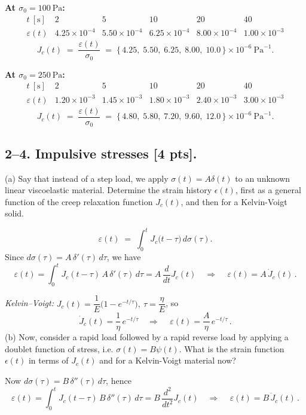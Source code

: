 \noindent\textbf{At $\sigma_0=100~\mathrm{Pa}$:}
$$
\begin{array}{c|ccccc}
t~[\mathrm{s}] & 2 & 5 & 10 & 20 & 40\\ \hline
\varepsilon(t) & 4.25\times10^{-4} & 5.50\times10^{-4} & 6.25\times10^{-4} & 8.00\times10^{-4} & 1.00\times10^{-3}
\end{array}
$$
$$
J_c(t)\;=\;\frac{\varepsilon(t)}{\sigma_0}
\;=\;
\{\,4.25,\;5.50,\;6.25,\;8.00,\;10.0\,\}\times10^{-6}\ \mathrm{Pa}^{-1}.
$$

\noindent\textbf{At $\sigma_0=250~\mathrm{Pa}$:}
$$
\begin{array}{c|ccccc}
t~[\mathrm{s}] & 2 & 5 & 10 & 20 & 40\\ \hline
\varepsilon(t) & 1.20\times10^{-3} & 1.45\times10^{-3} & 1.80\times10^{-3} & 2.40\times10^{-3} & 3.00\times10^{-3}
\end{array}
$$
$$
J_c(t)\;=\;\frac{\varepsilon(t)}{\sigma_0}
\;=\;
\{\,4.80,\;5.80,\;7.20,\;9.60,\;12.0\,\}\times10^{-6}\ \mathrm{Pa}^{-1}.
$$
\bigskip
\subsection*{2--4. \textbf{Impulsive stresses} [4 pts].}

(a) Say that instead of a step load, we apply $\sigma(t) = A \delta(t)$ to an unknown linear viscoelastic material. 
Determine the strain history $\epsilon(t)$, first as a general function of the creep relaxation function $J_c(t)$, and then for a Kelvin-Voigt solid.

$$
\varepsilon(t)\;=\;\int_{0}^{t} J_c\!\big(t-\tau\big)\,d\sigma(\tau).
$$
Since $d\sigma(\tau)=A\,\delta'(\tau)\,d\tau$, we have
$$
\varepsilon(t)
=\int_{0}^{t} J_c(t-\tau)\,A\,\delta'(\tau)\,d\tau
= A\,\frac{d}{dt}J_c(t)
\quad\Rightarrow\quad
\,\varepsilon(t)=A\,\dot J_c(t)\,.
$$

\emph{Kelvin--Voigt:} $J_c(t)=\dfrac{1}{E}\big(1-e^{-t/\tau}\big),\ \tau=\dfrac{\eta}{E}$, so
$$
\dot J_c(t)=\frac{1}{\eta}\,e^{-t/\tau}
\quad\Rightarrow\quad
\,\varepsilon(t)=\dfrac{A}{\eta}\,e^{-t/\tau}\,.
$$
(b) Now, consider a rapid load followed by a rapid reverse load by applying a doublet function of stress, i.e. $\sigma(t) = B \psi(t)$. 
What is the strain function $\epsilon(t)$ in terms of $J_c(t)$ and for a Kelvin-Voigt material now? 

Now $d\sigma(\tau)=B\,\delta''(\tau)\,d\tau$, hence
$$
\varepsilon(t)
=\int_{0}^{t} J_c(t-\tau)\,B\,\delta''(\tau)\,d\tau
= B\,\frac{d^2}{dt^2}J_c(t)
\quad\Rightarrow\quad
\,\varepsilon(t)=B\,\ddot J_c(t)\,.
$$

